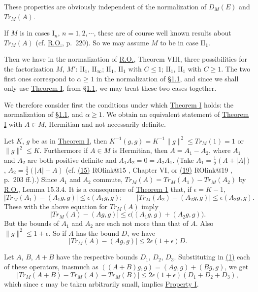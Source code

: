 \documentclass[twoside,leqno]{article}
\makeatletter
\newcommand{\TrM}{Tr_M}
\newcommand{\DM}{D_{M}}
\newcommand{\RO}{\href{https://doi.org/10.2307/1968693}{R.O.}}
\newcommand{\ROcite}[1]{%
  \@ifundefined{ROlink@#1}
    {\href{https://doi.org/10.2307/1968693}{(#1)}}
    {\csname ROlink@#1\endcsname{(#1)}}%
}
\newcommand{\SectionRef}[1]{\hyperlink{sec:#1}{\S#1}}
\newcommand{\StatementRef}[2]{\hyperlink{stmt:#1}{#2}}
\newcommand{\EquationTarget}[1]{\hypertarget{eq:#1}{}}
\newcommand{\EquationRef}[2]{\hyperlink{eq:#1}{#2}}
\makeatother
\begin{document}
These properties are obviously independent of the normalization of $\DM(E)$
and $\TrM(A)$.

If $M$ is in cases $\mathrm I_n$, $n=1,2,\cdots$, these are of course well known results
about $\TrM(A)$ (cf. \RO{}, p.~220). So we may assume $M$ to be in case $\mathrm{II}_1$.

Then we have in the normalization of \RO{}, Theorem VIII, three possibilities
for the factorization $M$, $M'$: $\mathrm{II}_1$, $\mathrm{II}_{\infty}$; $\mathrm{II}_1$, $\mathrm{II}_1$ with $C\leq1$;
$\mathrm{II}_1$, $\mathrm{II}_1$ with $C\geq1$. The two first ones correspond to $\alpha\geq1$ in the normalization of
\SectionRef{1.1}, and since we shall only use \StatementRef{theorem:I}{Theorem I}, from \SectionRef{1.1}, we may treat these two
cases together.

We therefore consider first the conditions under which \StatementRef{theorem:I}{Theorem I} holds:
the normalization of \SectionRef{1.1}, and $\alpha\geq1$. We obtain an equivalent statement of
\StatementRef{theorem:I}{Theorem I} with $A\in M$, Hermitian and not necessarily definite.

Let $K$, $g$ be as in \StatementRef{theorem:I}{Theorem I}, then
$K^{-1}(g,g)=K^{-1}\lVert g\rVert^2\leq\TrM(1)=1$ or
$\lVert g\rVert^2\leq K$. Furthermore if $A\in M$ is Hermitian, then $A=A_1-A_2$, where $A_1$ and $A_2$
are both positive definite and $A_1A_2=0=A_2A_1$. (Take
$A_1=\tfrac12(A+\lvert A\rvert)$, $A_2=\tfrac12(\lvert A\rvert-A)$
(cf. \ROcite{15}, Chapter VI, or \ROcite{19}, p.~203 ff.).) Since $A_1$ and $A_2$
commute, $\TrM(A)=\TrM(A_1)-\TrM(A_2)$ by \RO{}, Lemma 15.3.4. It is a consequence
of \StatementRef{theorem:I}{Theorem 1} that, if $\epsilon=K-1$,
\[
 \lvert\TrM(A_1)-(A_1g,g)\rvert\leq\epsilon(A_1g,g);
 \qquad
 \lvert\TrM(A_2)-(A_2g,g)\rvert\leq\epsilon(A_2g,g).
\]
These with the above equation for $\TrM(A)$ imply
\[
 \lvert\TrM(A)-(Ag,g)\rvert
 \leq\epsilon\bigl((A_1g,g)+(A_2g,g)\bigr).
\]
But the bounds of $A_1$ and $A_2$ are each not more than that of $A$. Also
$\lVert g\rVert^2\leq1+\epsilon$. So if $A$ has the bound $D$, we have
\EquationTarget{1}
\[
 \lvert\TrM(A)-(Ag,g)\rvert\leq2\epsilon(1+\epsilon)D.
\]

Let $A$, $B$, $A+B$ have the respective bounds $D_1$, $D_2$, $D_3$. Substituting in
\EquationRef{1}{(1)} each of these operators, inasmuch as
$((A+B)g,g)=(Ag,g)+(Bg,g)$, we get
\[
 \lvert\TrM(A+B)-\TrM(A)-\TrM(B)\rvert
 \leq2\epsilon(1+\epsilon)(D_1+D_2+D_3),
\]
which since $\epsilon$ may be taken arbitrarily small, implies
\StatementRef{property:I}{Property I}.
\end{document}
